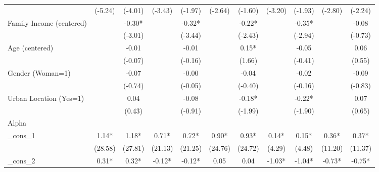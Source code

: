 {\begin{tabular*}{\hsize}{@{\hskip\tabcolsep\extracolsep\fill}l*{10}{c}}
                    &     (-5.24) &     (-4.01) &     (-3.43) &     (-1.97) &     (-2.64) &     (-1.60) &     (-3.20) &     (-1.93) &     (-2.80) &     (-2.24) \\
Family Income (centered)&             &       -0.30*&             &       -0.32*&             &       -0.22*&             &       -0.35*&             &       -0.08 \\
                    &             &     (-3.01) &             &     (-3.44) &             &     (-2.43) &             &     (-2.94) &             &     (-0.73) \\
Age (centered)      &             &       -0.01 &             &       -0.01 &             &        0.15*&             &       -0.05 &             &        0.06 \\
                    &             &     (-0.07) &             &     (-0.16) &             &      (1.66) &             &     (-0.41) &             &      (0.55) \\
Gender (Woman=1)    &             &       -0.07 &             &       -0.00 &             &       -0.04 &             &       -0.02 &             &       -0.09 \\
                    &             &     (-0.74) &             &     (-0.05) &             &     (-0.40) &             &     (-0.16) &             &     (-0.83) \\
Urban Location (Yes=1)&             &        0.04 &             &       -0.08 &             &       -0.18*&             &       -0.22*&             &        0.07 \\
                    &             &      (0.43) &             &     (-0.91) &             &     (-1.99) &             &     (-1.90) &             &      (0.65) \\
\midrule
Alpha               &             &             &             &             &             &             &             &             &             &             \\
\_cons\_1             &        1.14*&        1.18*&        0.71*&        0.72*&        0.90*&        0.93*&        0.14*&        0.15*&        0.36*&        0.37*\\
                    &     (28.58) &     (27.81) &     (21.13) &     (21.25) &     (24.76) &     (24.72) &      (4.29) &      (4.48) &     (11.20) &     (11.37) \\
\_cons\_2             &        0.31*&        0.32*&       -0.12*&       -0.12*&        0.05 &        0.04 &       -1.03*&       -1.04*&       -0.73*&       -0.75*\\

\end{tabular*}}

